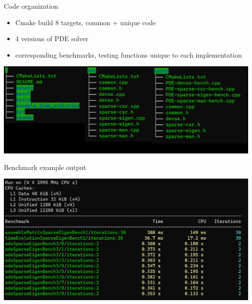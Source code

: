 \documentclass[aspectratio=169,xcolor=dvipsnames]{beamer}
\begin{document}
\begin{frame}{Code organization}
    \begin{itemize}
        \item Cmake build 8 targets, common + unique code
        \item 4 versions of PDE solver
        \item corresponding benchmarks, testing functions unique to each implementation 
    \end{itemize}
    
    \begin{center}
    \includegraphics[width=0.8\linewidth]{code_structure.png}
    \end{center}
\end{frame}


\begin{frame}{Benchmark example output}
   \begin{center}
   \includegraphics[width=0.8\linewidth]{example_benchmark.png}
   \end{center}
\end{frame}

\end{document}
